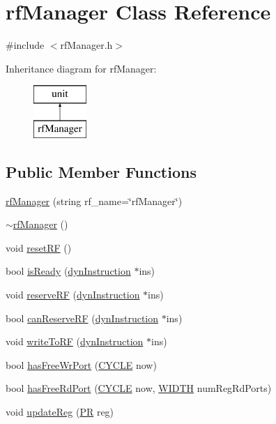 \hypertarget{classrfManager}{
\section{rfManager Class Reference}
\label{classrfManager}
}


{\ttfamily \#include $<$rfManager.h$>$}

Inheritance diagram for rfManager:\begin{figure}[H]
\begin{center}
\leavevmode
\includegraphics[height=2.000000cm]{classrfManager}
\end{center}
\end{figure}
\subsection*{Public Member Functions}
\begin{DoxyCompactItemize}
\item 
\hyperlink{classrfManager_a3aba0353412141b854b902f87918d760}{rfManager} (string rf\_\-name=\char`\"{}rfManager\char`\"{})
\item 
\hyperlink{classrfManager_adc5fb894c52570de06137128a65256e3}{$\sim$rfManager} ()
\item 
void \hyperlink{classrfManager_aca3886ea56db6dd13b096be05adee188}{resetRF} ()
\item 
bool \hyperlink{classrfManager_ab5c5242744de56fd2f46c11ac3d9472b}{isReady} (\hyperlink{classdynInstruction}{dynInstruction} $\ast$ins)
\item 
void \hyperlink{classrfManager_ab38c1244739ba189161c3026361464ec}{reserveRF} (\hyperlink{classdynInstruction}{dynInstruction} $\ast$ins)
\item 
bool \hyperlink{classrfManager_a487ae2b2c425f4a15a6ee49fe37d5afd}{canReserveRF} (\hyperlink{classdynInstruction}{dynInstruction} $\ast$ins)
\item 
void \hyperlink{classrfManager_ae5dc11fc5a35d9985601f94e0176d32d}{writeToRF} (\hyperlink{classdynInstruction}{dynInstruction} $\ast$ins)
\item 
bool \hyperlink{classrfManager_a9aad410daccdc0876c0c13cedbbc7855}{hasFreeWrPort} (\hyperlink{global_2global_8h_a7e19a550ec11d1ed921deb20c22efb5b}{CYCLE} now)
\item 
bool \hyperlink{classrfManager_a4297b24b6ce9533206fe5b50554ffa13}{hasFreeRdPort} (\hyperlink{global_2global_8h_a7e19a550ec11d1ed921deb20c22efb5b}{CYCLE} now, \hyperlink{global_2global_8h_a6fa2e24b8a418fa215e183264cbea3aa}{WIDTH} numRegRdPorts)
\item 
void \hyperlink{classrfManager_a1817bd1f92e1d3c3e35d941722a5e5c3}{updateReg} (\hyperlink{global_2global_8h_a54dcae2ba04c76c12afe113b706bd4dc}{PR} reg)
\end{DoxyCompactItemize}


